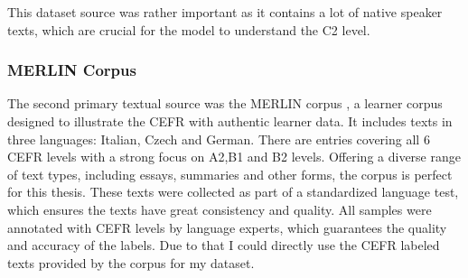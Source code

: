 This dataset source was rather important as it contains a lot of native speaker texts, which are crucial for the model to understand the C2 level.

\subsubsection*{MERLIN Corpus}
\label{sss:merlin_corpus}
The second primary textual source was the MERLIN corpus \citep{boyd2014merlin}, a learner corpus designed to illustrate the CEFR with authentic learner data. It includes texts in three languages: Italian, Czech and German. There are entries covering all 6 CEFR levels with a strong focus on A2,B1 and B2 levels. Offering a diverse range of text types, including essays, summaries and other forms, the corpus is perfect for this thesis. These texts were collected as part of a standardized language test, which ensures the texts have great consistency and quality. All samples were annotated with CEFR levels by language experts, which guarantees the quality and accuracy of the labels. Due to that I could directly use the CEFR labeled texts provided by the corpus for my dataset.

